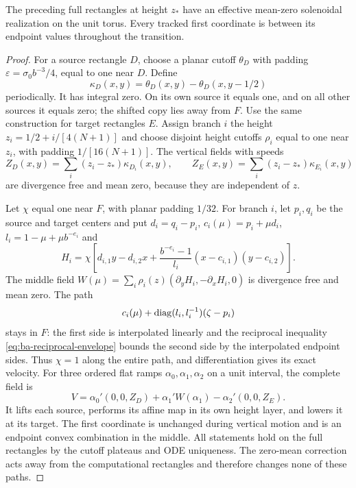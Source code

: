 \begin{proposition}\label{bc:halfline-transport}
The preceding full rectangles at height $z_*$ have an effective mean-zero
solenoidal realization on the unit torus. Every tracked first coordinate
is between its endpoint values throughout the transition.
\end{proposition}
\begin{proof}\label{bc:halfline-transport-proof}
For a source rectangle $D$, choose a planar cutoff $\theta_D$ with
padding $\varepsilon=\sigma_0b^{-3}/4$, equal to one near $D$. Define
\[
 \kappa_D(x,y)=\theta_D(x,y)-\theta_D(x,y-1/2)
\]
periodically. It has integral zero. On its own source it equals one,
and on all other sources it equals zero; the shifted copy lies away from
$F$. Use the same construction for target rectangles $E$. Assign branch
$i$ the height $z_i=1/2+i/[4(N+1)]$ and choose disjoint height cutoffs
$\rho_i$ equal to one near $z_i$, with padding $1/[16(N+1)]$. The
vertical fields with speeds
\[
 Z_D(x,y)=\sum_i(z_i-z_*)\kappa_{D_i}(x,y),\qquad
 Z_E(x,y)=\sum_i(z_i-z_*)\kappa_{E_i}(x,y)
\]
are divergence free and mean zero, because they are independent of $z$.

Let $\chi$ equal one near $F$, with planar padding $1/32$. For branch
$i$, let $p_i,q_i$ be the source and target centers and put $d_i=q_i-p_i$, $c_i(\mu)=p_i+\mu d_i$,
$l_i=1-\mu+\mu b^{-e_i}$ and
\[
 H_i=\chi\left[d_{i,1}y-d_{i,2}x+
 \frac{b^{-e_i}-1}{l_i}(x-c_{i,1})(y-c_{i,2})\right].
\]
The middle field $W(\mu)=\sum_i\rho_i(z)(\partial_yH_i,-\partial_xH_i,0)$
is divergence free and mean zero. The path
\begin{equation}\label{bc:halfline-path}
 c_i(\mu)+\operatorname{diag}(l_i,l_i^{-1})(\zeta-p_i)
\end{equation}
stays in $F$: the first side is interpolated linearly and the reciprocal
inequality \eqref{eq:ba-reciprocal-envelope} bounds the second side
by the interpolated endpoint sides. Thus $\chi=1$ along the entire
path, and differentiation gives its exact velocity.
For three ordered flat ramps $\alpha_0,\alpha_1,\alpha_2$ on a unit
interval, the complete field is
\begin{equation}\label{bc:halfline-period}
 V=\alpha_0'(0,0,Z_D)+\alpha_1'W(\alpha_1)
                   -\alpha_2'(0,0,Z_E).
\end{equation}
It lifts each source, performs its affine map in its own height layer,
and lowers it at its target. The first coordinate is unchanged during
vertical motion and is an endpoint convex combination in the middle.
All statements hold on the full rectangles by the cutoff plateaus and
ODE uniqueness. The zero-mean correction acts away from the computational
rectangles and therefore changes none of these paths.
\end{proof}

